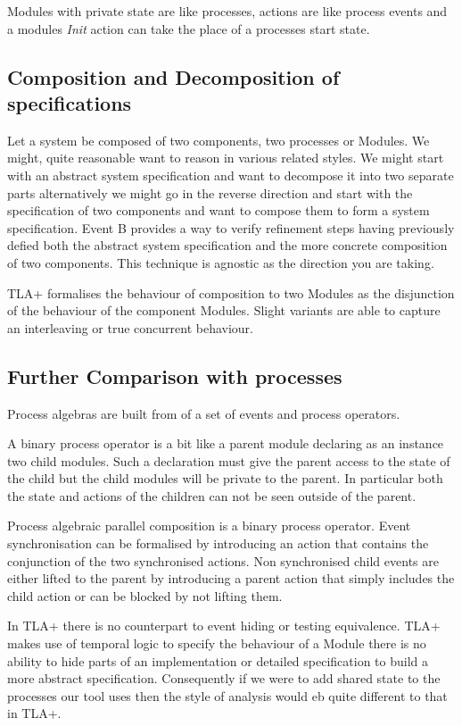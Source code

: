 \documentclass[]{article}
\begin{document}
Modules with private state are like processes, actions are like process events and a modules \emph{Init} action can take the place of a processes start state.

\subsection{Composition and Decomposition of specifications}
Let a system be composed of two components, two processes or Modules. We might, quite reasonable  want to reason in various  related  styles. We might start with an abstract system specification and want to decompose it into two separate parts alternatively  we might go in the reverse direction and start with the specification of two components and want to compose them to form a system specification.  Event B provides a way to verify refinement steps having previously defied both the abstract system specification and the more concrete composition of two components. This technique is agnostic as the direction you are taking.

TLA+ formalises the behaviour of  composition to two Modules as the disjunction of the behaviour of the component Modules. Slight variants are able to capture an interleaving or true concurrent behaviour.

\subsection{Further Comparison with processes}

Process algebras are built from  of a set of events and process operators.


A binary process operator  is a bit like a parent module declaring as an instance two child modules.  Such a declaration must give the parent access to the state of the child but  the child modules will be private to the parent.  In particular both the state and actions of the children can not be seen outside of the parent.

Process algebraic parallel composition  is a binary process operator.
Event synchronisation can be formalised by introducing an action that contains the conjunction of the two synchronised actions. Non synchronised child events are either lifted to the parent  by introducing a parent action that simply includes the child action or can be blocked by not lifting them.



In TLA+ there is no counterpart to event hiding or testing equivalence. TLA+ makes use of temporal logic to specify the behaviour of a Module there is no ability to hide parts of an implementation or  detailed specification  to build a more abstract specification.
Consequently if we were to add shared state to the processes our tool uses then the style of analysis would eb quite different to that in TLA+.
\end{document}
